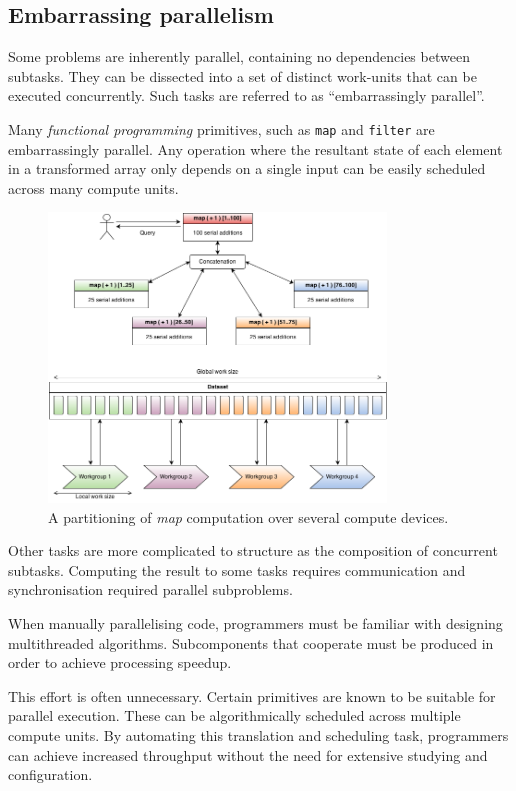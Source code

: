 \subsection{Embarrassing parallelism}
Some problems are inherently parallel, containing no dependencies between subtasks. They can be dissected into a set of distinct work-units that can be executed concurrently.
Such tasks are referred to as ``embarrassingly parallel''.

Many \emph{functional programming} primitives, such as \verb|map| and \verb|filter| are embarrassingly parallel.
Any operation where the resultant state of each element in a transformed array only depends on a single input can be easily scheduled across many compute units.

\begin{figure}[h]
  \includegraphics[width=0.8\textwidth]{./figures/map_task.png}
  \caption{A partitioning of \emph{map} computation over several compute devices.}
  \label{fig:map_task}
\end{figure}

Other tasks are more complicated to structure as the composition of concurrent subtasks. Computing the result to some tasks requires communication and synchronisation required parallel subproblems.

When manually parallelising code, programmers must be familiar with designing multithreaded algorithms. Subcomponents that cooperate must be produced in order to achieve processing speedup.

This effort is often unnecessary. Certain primitives are known to be suitable for parallel execution. These can be algorithmically scheduled across multiple compute units. By automating this translation and scheduling task, programmers can achieve increased throughput without the need for extensive studying and configuration.

